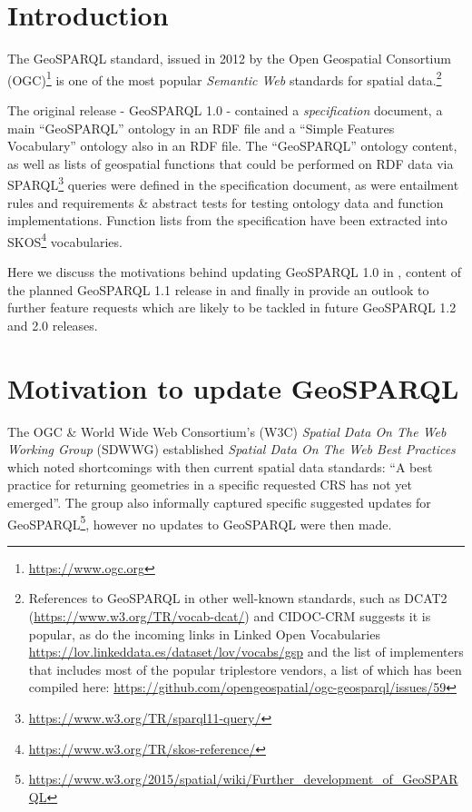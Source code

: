 \documentclass[runningheads]{llncs}
\begin{document}
\section{Introduction}\label{sec:introduction}
The GeoSPARQL standard, issued in 2012 by the Open Geospatial Consortium (OGC)\footnote{\url{https://www.ogc.org}} 
is one of the most popular \textit{Semantic Web} standards for spatial data.\footnote{References to GeoSPARQL in other well-known standards, 
such as DCAT2 (\url{https://www.w3.org/TR/vocab-dcat/}) and CIDOC-CRM \cite{doerr2013crmgeo} suggests it is popular, as do the incoming links in Linked Open Vocabularies \url{https://lov.linkeddata.es/dataset/lov/vocabs/gsp} and the list of implementers that includes most of the popular triplestore vendors, a list of which has been compiled here: \url{https://github.com/opengeospatial/ogc-geosparql/issues/59}}

The original release - GeoSPARQL 1.0 - contained a \textit{specification} document,
a main ``GeoSPARQL'' ontology in an RDF file and a ``Simple Features Vocabulary'' ontology also in an RDF file. The 
``GeoSPARQL'' ontology content, as well as lists of geospatial functions that could be performed on RDF data via 
SPARQL\footnote{\url{https://www.w3.org/TR/sparql11-query/}} queries were defined in the specification document, as
were entailment rules and requirements \& abstract tests for testing ontology data and function implementations. 
Function lists from the specification have been extracted into SKOS\footnote{\url{https://www.w3.org/TR/skos-reference/}}
vocabularies.

Here we discuss the motivations behind updating GeoSPARQL 1.0 in , content of the planned GeoSPARQL 1.1 release in  and finally in  provide an outlook to further feature requests which are likely to be tackled in future GeoSPARQL 1.2 and 2.0 releases.


\section{Motivation to update GeoSPARQL}\label{sec:motivation}
The OGC \& World Wide Web Consortium's (W3C) \textit{Spatial Data On The Web Working Group}
(SDWWG) established \textit{Spatial Data On The Web Best Practices}~\cite{van_den_brink_best_2018} which noted 
shortcomings with then current spatial data standards: ``A best practice for returning geometries in a 
specific requested CRS has not yet emerged''. The group also informally captured specific suggested updates for 
GeoSPARQL\footnote{\url{https://www.w3.org/2015/spatial/wiki/Further_development_of_GeoSPARQL}}, however no updates 
to GeoSPARQL were then made.
\end{document}
